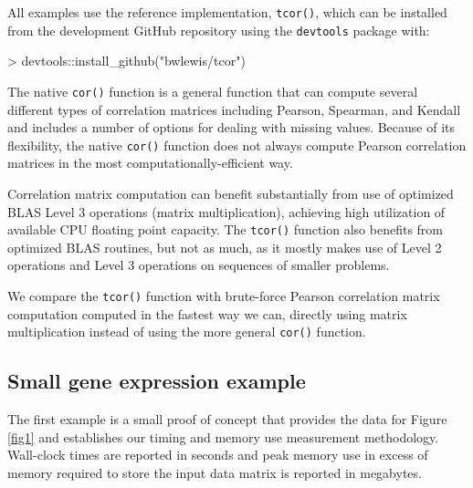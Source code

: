 \documentclass[article]{jss}
\numberwithin{algorithmctr}{section}
\begin{document}
All examples use the reference  implementation, {\tt tcor()}, which can be
installed from the development GitHub repository using the
{\tt devtools} package with:

\begin{Schunk}
\begin{Sinput}
> devtools::install_github("bwlewis/tcor")
\end{Sinput}
\end{Schunk}

The native  {\tt cor()} function is a general function that can
compute several different types of correlation matrices including Pearson,
Spearman, and Kendall and includes a number of options for dealing with missing
values.  Because of its flexibility, the native {\tt cor()} function does not
always compute Pearson correlation matrices in the most
computationally-efficient way.

Correlation matrix computation can benefit substantially from use of optimized
BLAS Level 3 operations (matrix multiplication), achieving high utilization of
available CPU floating point capacity. The {\tt tcor()} function also benefits
from optimized BLAS routines, but not as much, as it mostly makes use of Level
2 operations and Level 3 operations on sequences of smaller problems.

We compare the {\tt tcor()} function with brute-force Pearson correlation
matrix computation computed in the fastest way we can, directly using matrix
multiplication instead of using the more general {\tt cor()} function.


\subsection{Small gene expression example}

The first example is a small proof of concept that provides the data for Figure
\ref{fig1} and establishes our timing and memory use measurement methodology.
Wall-clock times are reported in seconds and peak memory use in excess of
memory required to store the input data matrix is reported in megabytes.
\end{document}
